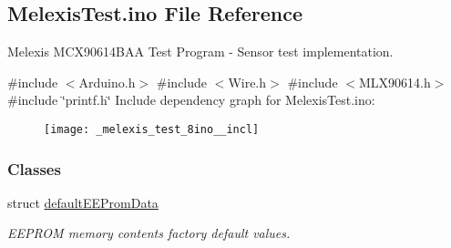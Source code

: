 \hypertarget{_melexis_test_8ino}{}\subsection{Melexis\+Test.\+ino File Reference}
\label{_melexis_test_8ino}


Melexis M\+C\+X90614\+B\+AA Test Program -\/ Sensor test implementation. ~\newline
  


{\ttfamily \#include $<$Arduino.\+h$>$}\newline
{\ttfamily \#include $<$Wire.\+h$>$}\newline
{\ttfamily \#include $<$M\+L\+X90614.\+h$>$}\newline
{\ttfamily \#include \char`\"{}printf.\+h\char`\"{}}\newline
Include dependency graph for Melexis\+Test.\+ino\+:\nopagebreak
\begin{figure}[H]
\begin{center}
\leavevmode
\texttt{[image: \_melexis\_test\_8ino\_\_incl]}
\end{center}
\end{figure}
\subsubsection*{Classes}
\begin{DoxyCompactItemize}
\item 
struct \mbox{\hyperlink{structdefault_e_e_prom_data}{default\+E\+E\+Prom\+Data}}
\begin{DoxyCompactList}\small\item\em E\+E\+P\+R\+OM memory contents factory default values. \end{DoxyCompactList}\end{DoxyCompactItemize}
